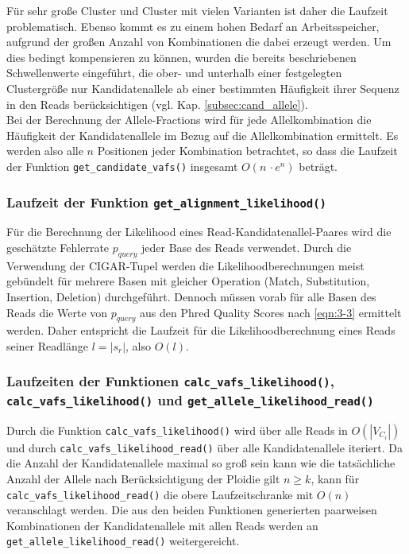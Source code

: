Für sehr große Cluster und Cluster mit vielen Varianten ist daher die Laufzeit problematisch. Ebenso kommt es zu einem hohen Bedarf an Arbeitsspeicher, aufgrund der großen Anzahl von Kombinationen die dabei erzeugt werden. Um dies bedingt kompensieren zu können, wurden die bereits beschriebenen Schwellenwerte eingeführt, die ober- und unterhalb einer festgelegten Clustergröße nur Kandidatenallele ab einer bestimmten Häufigkeit ihrer Sequenz in den Reads berücksichtigen (vgl. Kap. \ref{subsec:cand_allele}).\\

Bei der Berechnung der Allele-Fractions wird für jede Allelkombination die Häufigkeit der Kandidatenallele im Bezug auf die Allelkombination ermittelt. Es werden also alle $n$ Positionen jeder Kombination betrachtet, so dass die Laufzeit der Funktion \lstinline|get_candidate_vafs()| insgesamt $ O(n\, \cdotp e^n)$ beträgt. 

\subsubsection{Laufzeit der Funktion \lstinline|get_alignment_likelihood()|}

Für die Berechnung der Likelihood eines Read-Kandidatenallel-Paares wird die geschätzte Fehlerrate $ p_{query} $ jeder Base des Reads verwendet. Durch die Verwendung der CIGAR-Tupel werden die Likelihoodberechnungen meist gebündelt für mehrere Basen mit gleicher Operation (Match, Substitution, Insertion, Deletion) durchgeführt. Dennoch müssen vorab für alle Basen des Reads die Werte von $ p_{query} $ aus den Phred Quality Scores nach \eqref{eqn:3-3} ermittelt werden. Daher entspricht die Laufzeit für die Likelihoodberechnung eines Reads seiner Readlänge $ l = |s_{r}| $, also $O(l)$.


\subsubsection{Laufzeiten der Funktionen \lstinline|calc_vafs_likelihood()|, \lstinline|calc_vafs_likelihood()| und \lstinline|get_allele_likelihood_read()|}

Durch die Funktion \lstinline|calc_vafs_likelihood()| wird über alle Reads in $ O(|V_{C_{i}}|) $ und durch \lstinline|calc_vafs_likelihood_read()| über alle Kandidatenallele iteriert. Da die Anzahl der Kandidatenallele maximal so groß sein kann wie die tatsächliche Anzahl der Allele nach Berücksichtigung der Ploidie gilt $n \geq k$, kann für \lstinline|calc_vafs_likelihood_read()| die obere Laufzeitschranke mit $ O(n) $ veranschlagt werden. Die aus den beiden Funktionen generierten paarweisen Kombinationen der Kandidatenallele mit allen Reads werden an \linebreak \lstinline|get_allele_likelihood_read()| weitergereicht.\\

